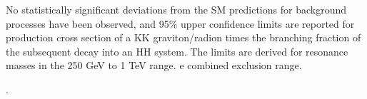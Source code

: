 No statistically significant deviations from the SM predictions for
background processes have been observed, and 95\% upper confidence limits are reported for production cross section
of a KK graviton/radion times the branching fraction of the subsequent decay into an
HH system. The limits are derived for resonance masses in the 250 GeV to 1 TeV range.
e combined exclusion range.                                                                                                                                               


.                                                                                                                                                                         

